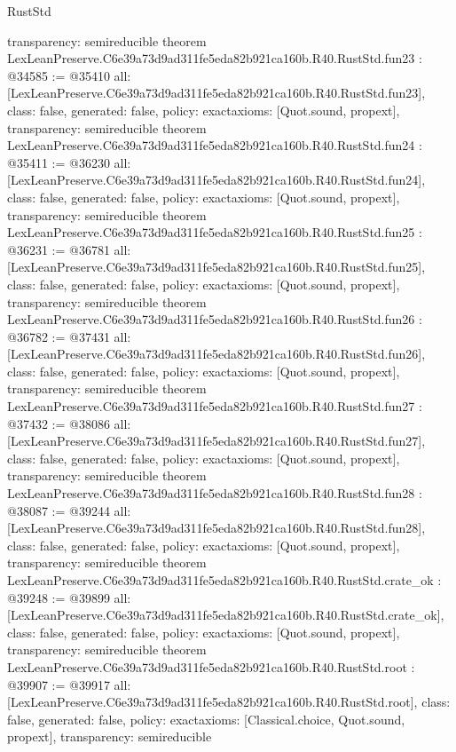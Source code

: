 \begin{lexlean}{RustStd}
\begin{coremodule}
{  transparency: semireducible
}
theorem LexLeanPreserve.C6e39a73d9ad311fe5eda82b921ca160b.R40.RustStd.fun23 : @34585 := @35410 {
  all: [LexLeanPreserve.C6e39a73d9ad311fe5eda82b921ca160b.R40.RustStd.fun23],
  class: false,
  generated: false,
  policy: exact{axioms: [Quot.sound, propext]},
  transparency: semireducible
}
theorem LexLeanPreserve.C6e39a73d9ad311fe5eda82b921ca160b.R40.RustStd.fun24 : @35411 := @36230 {
  all: [LexLeanPreserve.C6e39a73d9ad311fe5eda82b921ca160b.R40.RustStd.fun24],
  class: false,
  generated: false,
  policy: exact{axioms: [Quot.sound, propext]},
  transparency: semireducible
}
theorem LexLeanPreserve.C6e39a73d9ad311fe5eda82b921ca160b.R40.RustStd.fun25 : @36231 := @36781 {
  all: [LexLeanPreserve.C6e39a73d9ad311fe5eda82b921ca160b.R40.RustStd.fun25],
  class: false,
  generated: false,
  policy: exact{axioms: [Quot.sound, propext]},
  transparency: semireducible
}
theorem LexLeanPreserve.C6e39a73d9ad311fe5eda82b921ca160b.R40.RustStd.fun26 : @36782 := @37431 {
  all: [LexLeanPreserve.C6e39a73d9ad311fe5eda82b921ca160b.R40.RustStd.fun26],
  class: false,
  generated: false,
  policy: exact{axioms: [Quot.sound, propext]},
  transparency: semireducible
}
theorem LexLeanPreserve.C6e39a73d9ad311fe5eda82b921ca160b.R40.RustStd.fun27 : @37432 := @38086 {
  all: [LexLeanPreserve.C6e39a73d9ad311fe5eda82b921ca160b.R40.RustStd.fun27],
  class: false,
  generated: false,
  policy: exact{axioms: [Quot.sound, propext]},
  transparency: semireducible
}
theorem LexLeanPreserve.C6e39a73d9ad311fe5eda82b921ca160b.R40.RustStd.fun28 : @38087 := @39244 {
  all: [LexLeanPreserve.C6e39a73d9ad311fe5eda82b921ca160b.R40.RustStd.fun28],
  class: false,
  generated: false,
  policy: exact{axioms: [Quot.sound, propext]},
  transparency: semireducible
}
theorem LexLeanPreserve.C6e39a73d9ad311fe5eda82b921ca160b.R40.RustStd.crate_ok : @39248 := @39899 {
  all: [LexLeanPreserve.C6e39a73d9ad311fe5eda82b921ca160b.R40.RustStd.crate_ok],
  class: false,
  generated: false,
  policy: exact{axioms: [Quot.sound, propext]},
  transparency: semireducible
}
theorem LexLeanPreserve.C6e39a73d9ad311fe5eda82b921ca160b.R40.RustStd.root : @39907 := @39917 {
  all: [LexLeanPreserve.C6e39a73d9ad311fe5eda82b921ca160b.R40.RustStd.root],
  class: false,
  generated: false,
  policy: exact{axioms: [Classical.choice, Quot.sound, propext]},
  transparency: semireducible
}


\end{coremodule}
\end{lexlean}
